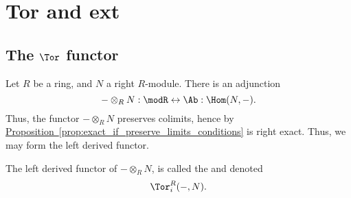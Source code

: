 \documentclass[main.tex]{subfiles}
\begin{document}
\chapter{Tor and ext}
\label{ch:tor_and_ext}

\section{The \texorpdfstring{$\Tor$}{Tor} functor}
\label{sec:tor}

Let $R$ be a ring, and $N$ a right $R$-module. There is an adjunction
\begin{equation*}
  - \otimes_{R} N : \modR \leftrightarrow \Ab : \Hom(N, -).
\end{equation*}
Thus, the functor $- \otimes_{R} N$ preserves colimits, hence by \hyperref[prop:exact_if_preserve_limits_conditions]{Proposition~\ref*{prop:exact_if_preserve_limits_conditions}} is right exact. Thus, we may form the left derived functor.

\begin{definition}
  \label{def:tor_functor}
  The left derived functor of $- \otimes_{R} N$, is called the  and denoted
  \begin{equation*}
    \Tor_{i}^{R}(-, N).
  \end{equation*}
\end{definition}
\end{document}
